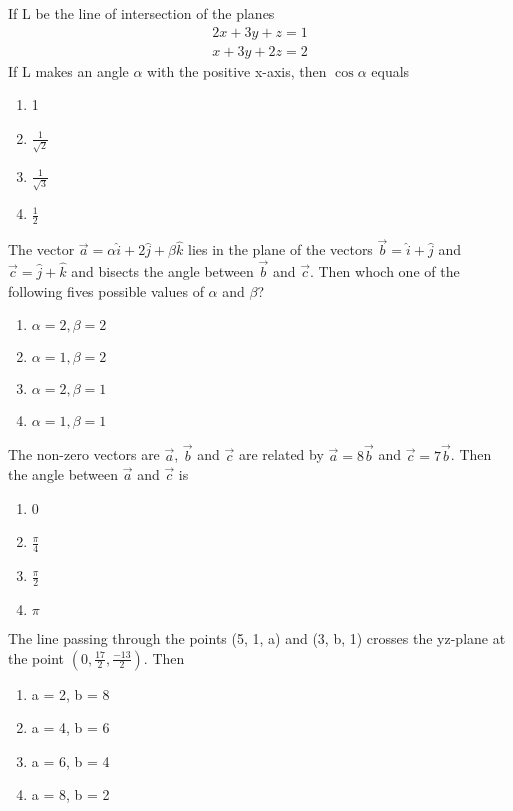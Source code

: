 \item If L be the line of intersection of the planes 
\begin{align*}
2x + 3y + z = 1
\end{align*}
\begin{align*}
x + 3y + 2z = 2
\end{align*}
If L makes an angle $\alpha$ with the positive x-axis, then $\cos\alpha$ equals
\begin{enumerate}
\item 1
\item $\frac{1}{\sqrt{2}}$
\item $\frac{1}{\sqrt{3}}$
\item $\frac{1}{2}$
\end{enumerate}

\item The vector $\overrightarrow{a} = \alpha\hat{i} + 2\hat{j} + \beta\hat{k}$ lies in the plane of the vectors $\overrightarrow{b} = \hat{i} + \hat{j}$ and $\overrightarrow{c} = \hat{j} + \hat{k}$ and bisects the angle between $\overrightarrow{b}$ and $\overrightarrow{c}$. Then whoch one of the following fives possible values of $\alpha$ and $\beta$?
\begin{enumerate}
\item $\alpha = 2, \beta = 2$
\item $\alpha = 1, \beta = 2$
\item $\alpha = 2, \beta = 1$
\item $\alpha = 1, \beta = 1$
\end{enumerate}

\item The non-zero vectors are $\overrightarrow{a}$, $\overrightarrow{b}$ and $\overrightarrow{c}$ are related by 
$\overrightarrow{a} = 8\overrightarrow{b}$ and $\overrightarrow{c} = 7\overrightarrow{b}$. Then the angle between 
$\overrightarrow{a}$ and $\overrightarrow{c}$ is
\begin{enumerate}
\item 0
\item $\frac{\pi}{4}$
\item $\frac{\pi}{2}$
\item $\pi$
\end{enumerate}

\item The line passing through the points (5, 1, a) and (3, b, 1) crosses the yz-plane at the point $(0,\frac{17}{2},\frac{-13}{2})$. Then
\begin{enumerate}
\item a = 2, b = 8
\item a = 4, b = 6
\item a = 6, b = 4
\item a = 8, b = 2
\end{enumerate}

